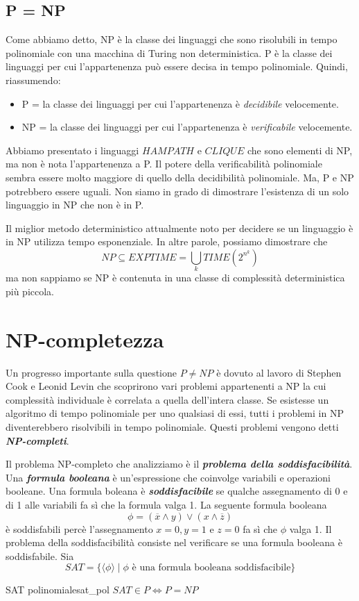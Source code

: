 \documentclass[12pt]{report}
\newcounter{theorem}
\newcommand{\nmu}{}
\begin{document}
\subsection{P = NP}
Come abbiamo detto, NP è la classe dei linguaggi che sono risolubili in tempo polinomiale con una macchina di Turing non deterministica. P è la classe dei linguaggi per cui l'appartenenza può essere decisa in tempo polinomiale. Quindi, riassumendo:
\begin{itemize}
	\item P = la classe dei linguaggi per cui l'appartenenza è \textit{decidibile} velocemente.
	\item NP = la classe dei linguaggi per cui l'appartenenza è \textit{verificabile} velocemente.
\end{itemize}
Abbiamo presentato i linguaggi $HAMPATH$ e $CLIQUE$ che sono elementi di NP, ma non è nota l'appartenenza a P. Il potere della verificabilità polinomiale sembra essere molto maggiore di quello della decidibilità polinomiale. Ma, P e NP potrebbero essere uguali. Non siamo in grado di dimostrare l'esistenza di un solo linguaggio in NP che non è in P.

Il miglior metodo deterministico attualmente noto per decidere se un linguaggio è in NP utilizza tempo esponenziale. In altre parole, possiamo dimostrare che
\[
NP \subseteq EXPTIME = \bigcup_k TIME\left(2^{n^k}\right)
\]
ma non sappiamo se NP è contenuta in una classe di complessità deterministica più piccola.
\section{NP-completezza}
Un progresso importante sulla questione $P \neq NP$ è dovuto al lavoro di Stephen Cook e Leonid Levin che scoprirono vari problemi appartenenti a NP la cui complessità individuale è correlata a quella dell'intera classe. Se esistesse un algoritmo di tempo polinomiale per uno qualsiasi di essi, tutti i problemi in NP diventerebbero risolvibili in tempo polinomiale. Questi problemi vengono detti \textbf{\textit{NP-completi}}.

Il problema NP-completo che analizziamo è il \textbf{\textit{problema della soddisfacibilità}}. Una \textbf{\textit{formula booleana}} è un'espressione che coinvolge variabili e operazioni booleane. Una formula boleana è \textbf{\textit{soddisfacibile}} se qualche assegnamento di 0 e di 1 alle variabili fa sì che la formula valga 1. La seguente formula booleana
\[
\phi = (\overline{x} \wedge y) \vee (x \wedge \overline{z})
\]
è soddisfabili percè l'assegnamento $x = 0, y = 1$ e $z = 0$ fa sì che $\phi$ valga 1. Il problema della soddisfacibilità consiste nel verificare se una formula booleana è soddisfabile. Sia
\[
SAT = \{\langle \phi \rangle \mid \phi \text{ è una formula booleana soddisfacibile}\}
\]
\begin{theorem}{\nmu SAT polinomiale}{sat_pol}
	$SAT \in P \iff P = NP$
\end{theorem}
\end{document}
